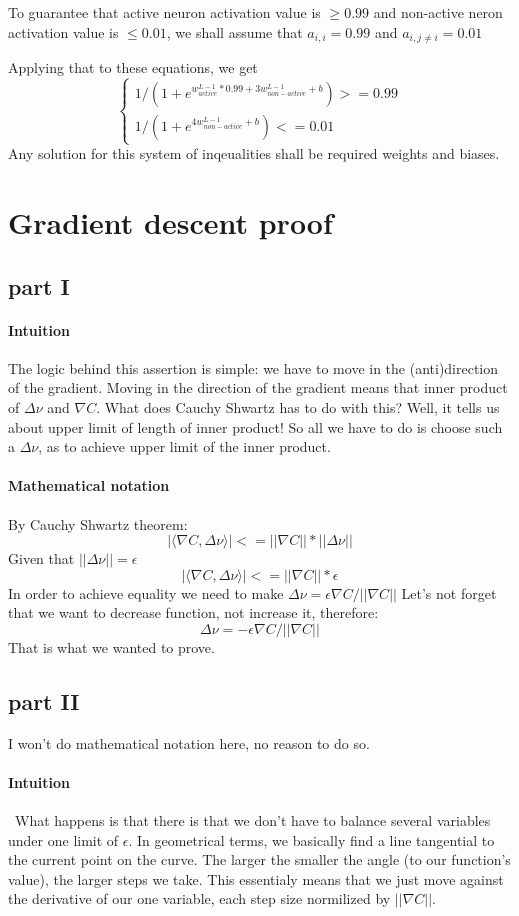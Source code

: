 \documentclass{article}
\begin{document}
To guarantee that active neuron activation value is $\geq 0.99$ and non-active neron activation value is $\leq 0.01$, we shall assume that $a_{i,i} = 0.99$ and $a_{i,j \neq i} = 0.01$

Applying that to these equations, we get
\[
\begin{cases}
1/(1 + e^{w_{active}^{L-1} * 0.99 + 3w_{non-active}^{L-1} + b}) >= 0.99\\
1/(1 + e^{4w_{non-active}^{L-1} + b}) <= 0.01
\end{cases}
\]
Any solution for this system of inqeualities shall be required weights and biases. 

\section{Gradient descent proof}
\subsection{part I}
\paragraph{Intuition}
The logic behind this assertion is simple: we have to move in the (anti)direction of the gradient.
Moving in the direction of the gradient means that inner product of ${\Delta}\nu$ and ${\nabla}C$.
What does Cauchy Shwartz has to do with this? 
Well, it tells us about  upper limit of length of inner product! 
So all we have to do is choose such a ${\Delta}\nu$, as to achieve upper limit of the inner product.
\paragraph{Mathematical notation}
By Cauchy Shwartz theorem:
$$|{\langle}{\nabla}C,{\Delta}\nu{\rangle}| <= ||{\nabla}C||*||{\Delta}\nu||$$
Given that $||{\Delta}\nu|| = \epsilon$
$$|{\langle}{\nabla}C,{\Delta}\nu{\rangle}| <= ||{\nabla}C||*\epsilon$$
In order to achieve equality we need to make ${\Delta}\nu = {\epsilon}{\nabla}C/||{\nabla}C||$
Let's not forget that we want to decrease function, not increase it, therefore:
$${\Delta}\nu = -{\epsilon}{\nabla}C/||{\nabla}C||$$
That is what we wanted to prove.

\subsection{part II}

I won't do mathematical notation here, no reason to do so.
\paragraph{Intuition}\
What happens is that there is that we don't have to balance several variables under one limit of $\epsilon$.
In geometrical terms, we basically find a line tangential to the current point on the curve.
The larger the smaller the angle (to our function's value), the larger steps we take.
This essentialy means that we just move against the derivative of our one variable, each step size normilized by $||{\nabla}C||$.
\end{document}
